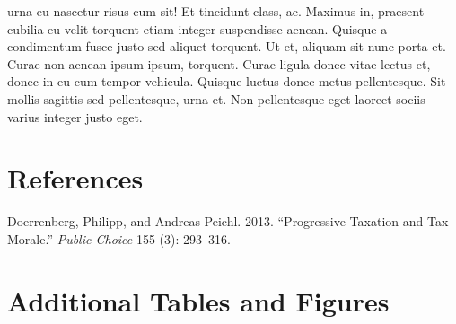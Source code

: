 \documentclass[
  12pt,
]{article}
\newlength{\cslhangindent}
\newlength{\cslentryspacingunit} %
\newenvironment{CSLReferences}[2] %
 {%
  \setlength{\parindent}{0pt}
  \ifodd #1
  \let\oldpar\par
  \def\par{\hangindent=\cslhangindent\oldpar}
  \fi
  \setlength{\parskip}{#2\cslentryspacingunit}
 }%
 {}
\newcommand{\beginsupplement}{\setcounter{table}{0}  \renewcommand{\thetable}{A\arabic{table}}     \setcounter{figure}{0} \renewcommand{\thefigure}{A\arabic{figure}}}
\begin{document}
urna eu nascetur risus cum sit! Et tincidunt class, ac. Maximus in, praesent cubilia eu velit torquent etiam integer suspendisse aenean. Quisque a condimentum fusce justo sed aliquet torquent. Ut et, aliquam sit nunc porta et. Curae non aenean ipsum ipsum, torquent. Curae ligula donec vitae lectus et, donec in eu cum tempor vehicula. Quisque luctus donec metus pellentesque. Sit mollis sagittis sed pellentesque, urna et. Non pellentesque eget laoreet sociis varius integer justo eget.

\hypertarget{references}{%
\section*{References}\label{references}}

\hypertarget{refs}{}
\begin{CSLReferences}{1}{0}
\leavevmode{}%
Doerrenberg, Philipp, and Andreas Peichl. 2013. {``Progressive Taxation and Tax Morale.''} \emph{Public Choice} 155 (3): 293--316.

\end{CSLReferences}

\clearpage

\hypertarget{appendix-appendix}{%
\appendix}


\beginsupplement

\hypertarget{additional-tables-and-figures}{%
\section{Additional Tables and Figures}\label{additional-tables-and-figures}}
\end{document}
